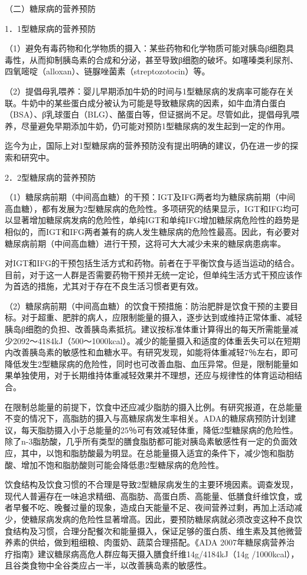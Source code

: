 （二）糖尿病的营养预防

{1．1型糖尿病的营养预防}

（1）避免有毒药物和化学物质的摄入：某些药物和化学物质可能对胰岛β细胞具毒性，从而抑制胰岛素的合成和分泌，甚至导致β细胞的破坏。如噻嗪类利尿剂、四氧嘧啶（alloxan）、链脲唑菌素（streptozotocin）等。

（2）提倡母乳喂养：婴儿早期添加牛奶的时间与1型糖尿病的发病率可能存在关联。牛奶中的某些蛋白成分被认为可能是导致糖尿病的因素，如牛血清白蛋白（BSA）、β乳球蛋白（BLG）、酪蛋白等，但证据尚不足。尽管如此，提倡母乳喂养，尽量避免早期添加牛奶，仍可能对预防1型糖尿病的发生起到一定的作用。

迄今为止，国际上对1型糖尿病的营养预防没有提出明确的建议，仍在进一步的探索和研究中。

{2．2型糖尿病的营养预防}

（1）糖尿病前期（中间高血糖）的干预：IGT及IFG两者均为糖尿病前期（中间高血糖），都有发展为2型糖尿病的危险性。多项研究的结果显示，IGT和IFG均可以显著增加糖尿病发病的危险性，单纯IGT和单纯IFG增加糖尿病危险性的趋势是相似的，而IGT和IFG两者兼有的病人发生糖尿病的危险性最高。因此，有必要对糖尿病前期（中间高血糖）进行干预，这将可大大减少未来的糖尿病患病率。

对IGT和IFG的干预包括生活方式和药物。前者在于平衡饮食与适当运动的结合。目前，对于这一人群是否需要药物干预并无统一定论，但单纯生活方式干预应该作为首选的措施，尤其对于存在不良生活习惯者更有效。

（2）糖尿病前期（中间高血糖）的饮食干预措施：防治肥胖是饮食干预的主要目标。对于超重、肥胖的病人，应限制能量的摄入，逐步达到或维持正常体重、减轻胰岛β细胞的负担、改善胰岛素抵抗。建议按标准体重计算得出的每天所需能量减少2092～4184kJ（500～1000kcal）。减少的能量摄入和适度的体重丢失可以在短期内改善胰岛素的敏感性和血糖水平。有研究发现，如能将体重减轻7％左右，即可降低发生2型糖尿病的危险性，同时也可改善血脂、血压异常。但是，限制能量如果单独使用，对于长期维持体重减轻效果并不理想，还应与规律性的体育运动相结合。

在限制总能量的前提下，饮食中还应减少脂肪的摄入比例。有研究报道，在总能量不变的情况下，高脂肪的摄入与高糖尿病发生率相关。ADA的糖尿病预防计划建议，每天脂肪摄入小于总能量的25％可有效减轻体重，降低2型糖尿病的危险性。除了n-3脂肪酸，几乎所有类型的膳食脂肪都可能对胰岛素敏感性有一定的负面效应，其中，以饱和脂肪酸最为明显。在总能量摄入适宜的条件下，减少饱和脂肪酸、增加不饱和脂肪酸则可能会降低患2型糖尿病的危险性。

饮食结构及饮食习惯的不合理是导致2型糖尿病发生的主要环境因素。调查发现，现代人普遍存在一味追求精细、高脂肪、高蛋白质、高能量、低膳食纤维饮食，或者早餐不吃、晚餐过量的现象，造成白天能量不足、夜间营养过剩，再加上活动减少，使糖尿病发病的危险性显著增高。因此，要预防糖尿病就必须改变这种不良饮食结构及习惯，合理分配餐次和能量摄入，保证足够的蛋白质、维生素及其他微营养素的供给，做到粗细粮、肉蛋奶、蔬菜合理搭配。《ADA
2007年糖尿病营养治疗指南》建议糖尿病高危人群应每天摄入膳食纤维14g/4184kJ（14g
/1000kcal），且谷类食物中全谷类应占一半，以改善胰岛素的敏感性。

